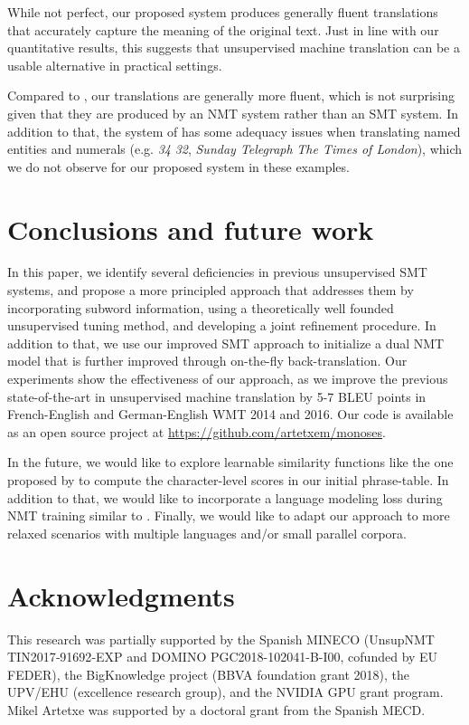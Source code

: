\documentclass[11pt,a4paper]{article}
\begin{document}
While not perfect, our proposed system produces generally fluent translations that accurately capture the meaning of the original text. Just in line with our quantitative results, this suggests that unsupervised machine translation can be a usable alternative in practical settings.

Compared to \citet{artetxe2018usmt}, our translations are generally more fluent, which is not surprising given that they are produced by an NMT system rather than an SMT system. In addition to that, the system of \citet{artetxe2018usmt} has some adequacy issues when translating named entities and numerals (e.g.  \textit{34}  \textit{32}, \textit{Sunday Telegraph}  \textit{The Times of London}), which we do not observe for our proposed system in these examples.


\section{Conclusions and future work}
\label{sec:conclusions}

In this paper, we identify several deficiencies in previous unsupervised SMT systems, and propose a more principled approach that addresses them by incorporating subword information, using a theoretically well founded unsupervised tuning method, and developing a joint refinement procedure. In addition to that, we use our improved SMT approach to initialize a dual NMT model that is further improved through on-the-fly back-translation. Our experiments show the effectiveness of our approach, as we improve the previous state-of-the-art in unsupervised machine translation by 5-7 BLEU points in French-English and German-English WMT 2014 and 2016. Our code is available as an open source project at \url{https://github.com/artetxem/monoses}.

In the future, we would like to explore learnable similarity functions like the one proposed by \citep{mccallum2005conditional} to compute the character-level scores in our initial phrase-table. In addition to that, we would like to incorporate a language modeling loss during NMT training similar to \citet{he2016dual}. Finally, we would like to adapt our approach to more relaxed scenarios with multiple languages and/or small parallel corpora.


\section*{Acknowledgments}

This research was partially supported by the Spanish MINECO (UnsupNMT TIN2017‐91692‐EXP and DOMINO PGC2018-102041-B-I00, cofunded by EU FEDER), the BigKnowledge project (BBVA foundation grant 2018), the UPV/EHU (excellence research group), and the NVIDIA GPU grant program. Mikel Artetxe was supported by a doctoral grant from the Spanish MECD.




\end{document}
